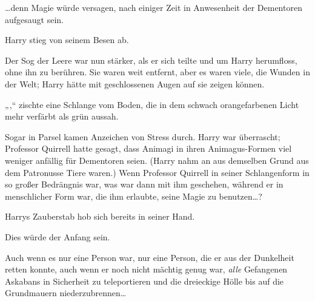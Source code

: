 …denn Magie würde versagen, nach einiger Zeit in Anwesenheit der Dementoren aufgesaugt sein.

Harry stieg von seinem Besen ab.

Der Sog der Leere war nun stärker, als er sich teilte und um Harry herumfloss, ohne ihn zu berühren. Sie waren weit entfernt, aber es waren viele, die Wunden in der Welt; Harry hätte mit geschlossenen Augen auf sie zeigen können.

„,“ zischte eine Schlange vom Boden, die in dem schwach orangefarbenen Licht mehr verfärbt als grün aussah.

Sogar in Parsel kamen Anzeichen von Stress durch. Harry war überrascht; Professor Quirrell hatte gesagt, dass Animagi in ihren Animagus-Formen viel weniger anfällig für Dementoren seien. (Harry nahm an aus demselben Grund aus dem Patronusse Tiere waren.) Wenn Professor Quirrell in seiner Schlangenform in so großer Bedrängnis war, was war dann mit ihm geschehen, während er in menschlicher Form war, die ihm erlaubte, seine Magie zu benutzen…?

Harrys Zauberstab hob sich bereits in seiner Hand.

Dies würde der Anfang sein.

Auch wenn es nur eine Person war, nur eine Person, die er aus der Dunkelheit retten konnte, auch wenn er noch nicht mächtig genug war, \emph{alle} Gefangenen Askabans in Sicherheit zu teleportieren und die dreieckige Hölle bis auf die Grundmauern niederzubrennen…


